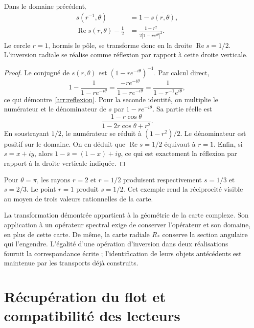 \begin{proposition}
\label{hrr:reflexion-compleja} Dans le domaine précédent,
\begin{align}
 s(r^{-1},\theta)&=1-\overline{s(r,\theta)},
 \label{hrr:reflexion}\\
 \operatorname{Re}s(r,\theta)-\frac12
 &=\frac{1-r^2}{2|1-re^{i\theta}|^2}.
 \label{hrr:reflexion-parte-real}
\end{align}
Le cercle \(r=1\), hormis le pôle, se transforme donc en la droite \(\operatorname{Re}s=1/2\). L’inversion radiale se réalise comme réflexion par rapport à cette droite verticale.
\end{proposition}
\begin{proof}
Le conjugué de \(s(r,\theta)\) est \((1-re^{-i\theta})^{-1}\). Par calcul direct,
\[
 1-\frac1{1-re^{-i\theta}}
 =\frac{-re^{-i\theta}}{1-re^{-i\theta}}
 =\frac1{1-r^{-1}e^{i\theta}},
\]
ce qui démontre \eqref{hrr:reflexion}. Pour la seconde identité, on multiplie le numérateur et le dénominateur de \(s\) par \(1-re^{-i\theta}\). Sa partie réelle est
\[
 \frac{1-r\cos\theta}{1-2r\cos\theta+r^2}.
\]
En soustrayant \(1/2\), le numérateur se réduit à \((1-r^2)/2\). Le dénominateur est positif sur le domaine. On en déduit que \(\operatorname{Re}s=1/2\) équivaut à \(r=1\). Enfin, si \(s=x+iy\), alors \(1-\overline s=(1-x)+iy\), ce qui est exactement la réflexion par rapport à la droite verticale indiquée.
\end{proof}

Pour \(\theta=\pi\), les rayons \(r=2\) et \(r=1/2\) produisent respectivement \(s=1/3\) et \(s=2/3\). Le point \(r=1\) produit \(s=1/2\). Cet exemple rend la réciprocité visible au moyen de trois valeurs rationnelles de la carte.

La transformation démontrée appartient à la géométrie de la carte complexe. Son application à un opérateur spectral exige de conserver l’opérateur et son domaine, en plus de cette carte. De même, la carte radiale \(R_*\) conserve la section angulaire qui l’engendre. L’égalité d’une opération d’inversion dans deux réalisations fournit la correspondance écrite ; l’identification de leurs objets antécédents est maintenue par les transports déjà construits.

\section{Récupération du flot et compatibilité des lecteurs}
\label{hrr:archivo}

